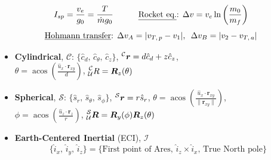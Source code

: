 \documentclass[twocolumn]{article}    %
\begin{document}
\begin{equation*}
    I_{sp} =\frac{v_e}{g_0} = \frac{T}{\dot{m} g_0} \hspace{30pt}  \text{\underline{Rocket eq.}: }\Delta v = v_e \ln \left(\frac{m_0}{m_f} \right)  
\end{equation*}
\begin{equation*}
    \text{\underline{Hohmann transfer}: } \Delta v_A = |v_{T,\,p} - v_1|, \hspace{5pt} \Delta v_B = |v_2 - v_{T,\,a}|
\end{equation*}

\begin{itemize}
    \item \textbf{Cylindrical}, \(\mathcal{C}\): \(\{\hat{c}_d,\, \hat{c}_\theta,\, \hat{c}_z\}\), \(\prescript{\mathcal{C}}{}{\bm{r}} = d\hat{c}_d + z \hat{c}_z\),\\ \(\theta = \operatorname{acos}\left(\frac{\hat{u}_x \cdot \bm{r}_{xy}}{d}\right)\), \(\prescript{\mathcal{C}}{\mathcal{U}}{R} = \bm{R}_z(\theta)\)
    \item \textbf{Spherical}, \(\mathcal{S}\): \(\{\hat{s}_r,\, \hat{s}_\theta,\,\hat{s}_\phi\}\), \(\prescript{\mathcal{S}}{}{\bm{r}} = r\hat{s}_r\), \(\theta = \operatorname{acos}\left( \frac{\hat{u}_x\cdot \bm{r}_{xy}}{\|\bm{r}_{xy}\|}\right)\),\\ \(\phi = \operatorname{acos}\left( \frac{\hat{u}_z\cdot \bm{r}_z}{r} \right)\), \(\prescript{\mathcal{S}}{\mathcal{U}}{\bm{R}} = \bm{R}_y(\phi)\bm{R}_z(\theta)\)
    \item \textbf{Earth-Centered Inertial} (ECI), \(\mathcal{I}\)
    \begin{equation*}
        \{\hat{i}_x,\, \hat{i}_y,\, \hat{i}_z\} = \{\text{First point of Ares},\,   \hat{i}_z \times \hat{i}_x,\, \text{True North pole} \}
    \end{equation*}
    

\end{itemize}
\end{document}
